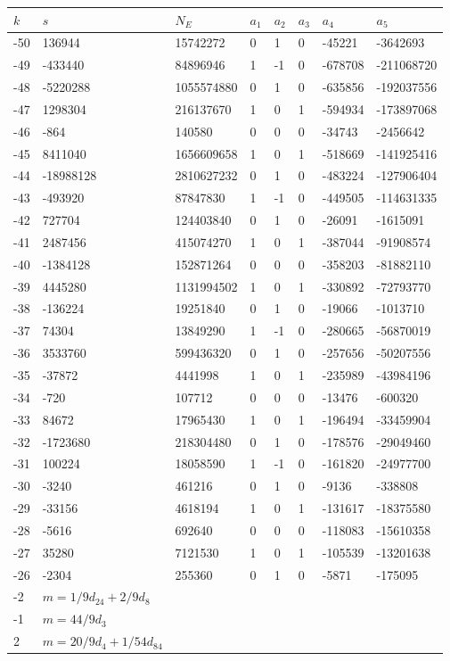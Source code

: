\documentclass{amsart}
\begin{document}
\begin{longtable}{|l|l|l|lllll|}
\hline
$k$ & $s$ & $N_E$ & $a_1$ & $a_2$ & $a_3$ & $a_4$ & $a_5$\\
\hline
-50&136944&15742272&0&1&0&-45221&-3642693\\
-49&-433440&84896946&1&-1&0&-678708&-211068720\\
-48&-5220288&1055574880&0&1&0&-635856&-192037556\\
-47&1298304&216137670&1&0&1&-594934&-173897068\\
-46&-864&140580&0&0&0&-34743&-2456642\\
-45&8411040&1656609658&1&0&1&-518669&-141925416\\
-44&-18988128&2810627232&0&1&0&-483224&-127906404\\
-43&-493920&87847830&1&-1&0&-449505&-114631335\\
-42&727704&124403840&0&1&0&-26091&-1615091\\
-41&2487456&415074270&1&0&1&-387044&-91908574\\
-40&-1384128&152871264&0&0&0&-358203&-81882110\\
-39&4445280&1131994502&1&0&1&-330892&-72793770\\
-38&-136224&19251840&0&1&0&-19066&-1013710\\
-37&74304&13849290&1&-1&0&-280665&-56870019\\
-36&3533760&599436320&0&1&0&-257656&-50207556\\
-35&-37872&4441998&1&0&1&-235989&-43984196\\
-34&-720&107712&0&0&0&-13476&-600320\\
-33&84672&17965430&1&0&1&-196494&-33459904\\
-32&-1723680&218304480&0&1&0&-178576&-29049460\\
-31&100224&18058590&1&-1&0&-161820&-24977700\\
-30&-3240&461216&0&1&0&-9136&-338808\\
-29&-33156&4618194&1&0&1&-131617&-18375580\\
-28&-5616&692640&0&0&0&-118083&-15610358\\
-27&35280&7121530&1&0&1&-105539&-13201638\\
-26&-2304&255360&0&1&0&-5871&-175095\\
-2&$m=1/9d_{24}+2/9d_{8}$&&\multicolumn{5}{c|}{}\\
-1&$m=44/9d_{3}$&&\multicolumn{5}{c|}{}\\
2&$m=20/9d_{4}+1/54d_{84}$&&\multicolumn{5}{c|}{}\\
\hline
\end{longtable}
\end{document}
